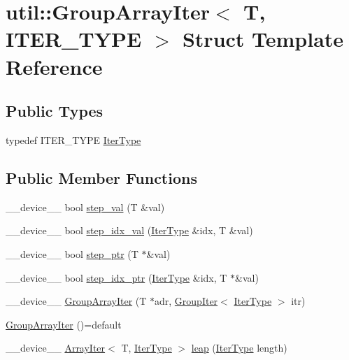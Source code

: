 \hypertarget{structutil_1_1GroupArrayIter}{\section{util\-:\-:Group\-Array\-Iter$<$ T, I\-T\-E\-R\-\_\-\-T\-Y\-P\-E $>$ Struct Template Reference}
\label{structutil_1_1GroupArrayIter}
}
\subsection*{Public Types}
\begin{DoxyCompactItemize}
\item 
typedef I\-T\-E\-R\-\_\-\-T\-Y\-P\-E \hyperlink{structutil_1_1GroupArrayIter_ad105aaa84576beb16fc721a13dfbd7d9}{Iter\-Type}
\end{DoxyCompactItemize}
\subsection*{Public Member Functions}
\begin{DoxyCompactItemize}
\item 
\-\_\-\-\_\-device\-\_\-\-\_\- bool \hyperlink{structutil_1_1GroupArrayIter_a4f5b8e3623924cfa365a699a91facbc8}{step\-\_\-val} (T \&val)
\item 
\-\_\-\-\_\-device\-\_\-\-\_\- bool \hyperlink{structutil_1_1GroupArrayIter_a0c72849302873b62711969a03c933745}{step\-\_\-idx\-\_\-val} (\hyperlink{structutil_1_1GroupArrayIter_ad105aaa84576beb16fc721a13dfbd7d9}{Iter\-Type} \&idx, T \&val)
\item 
\-\_\-\-\_\-device\-\_\-\-\_\- bool \hyperlink{structutil_1_1GroupArrayIter_a77d4e34e54fd4e94c2e570209b76501b}{step\-\_\-ptr} (T $\ast$\&val)
\item 
\-\_\-\-\_\-device\-\_\-\-\_\- bool \hyperlink{structutil_1_1GroupArrayIter_a0c15f11f5bb09388acb3dc0824b878b9}{step\-\_\-idx\-\_\-ptr} (\hyperlink{structutil_1_1GroupArrayIter_ad105aaa84576beb16fc721a13dfbd7d9}{Iter\-Type} \&idx, T $\ast$\&val)
\item 
\-\_\-\-\_\-device\-\_\-\-\_\- \hyperlink{structutil_1_1GroupArrayIter_a7135f34806bda921aecf02f928209bd6}{Group\-Array\-Iter} (T $\ast$adr, \hyperlink{structutil_1_1GroupIter}{Group\-Iter}$<$ \hyperlink{structutil_1_1GroupArrayIter_ad105aaa84576beb16fc721a13dfbd7d9}{Iter\-Type} $>$ itr)
\item 
\hyperlink{structutil_1_1GroupArrayIter_a4725148b8f531d4e529f4beec5cafbd0}{Group\-Array\-Iter} ()=default
\item 
\-\_\-\-\_\-device\-\_\-\-\_\- \hyperlink{structutil_1_1ArrayIter}{Array\-Iter}$<$ T, \hyperlink{structutil_1_1GroupArrayIter_ad105aaa84576beb16fc721a13dfbd7d9}{Iter\-Type} $>$ \hyperlink{structutil_1_1GroupArrayIter_aecbcde6dbc79c14ba2a8eb4d5e1a0a8b}{leap} (\hyperlink{structutil_1_1GroupArrayIter_ad105aaa84576beb16fc721a13dfbd7d9}{Iter\-Type} length)
\end{DoxyCompactItemize}
